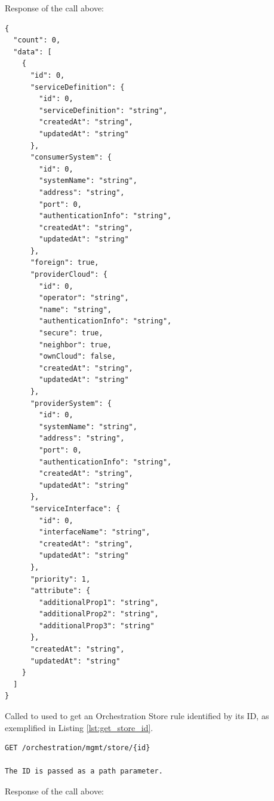 \documentclass[a4paper]{arrowhead}
\newcommand{\fref}[1]{{\textcolor{ArrowheadBlue}{\hyperref[sec:functions:#1]{#1}}}}
\begin{document}
Response of the call above:

\begin{lstlisting}[language=http,label={lst:get_consumer_res},caption={A \fref{Get Entries by Consumers} response is an StoreEntryList}]
{
  "count": 0,
  "data": [
    {
      "id": 0,
      "serviceDefinition": {
        "id": 0,
        "serviceDefinition": "string",
        "createdAt": "string",
        "updatedAt": "string"
      },
      "consumerSystem": {
        "id": 0,
        "systemName": "string",
        "address": "string",
        "port": 0,
        "authenticationInfo": "string",
        "createdAt": "string",
        "updatedAt": "string"
      },
      "foreign": true,
      "providerCloud": {
        "id": 0,
        "operator": "string",
        "name": "string",
        "authenticationInfo": "string",
        "secure": true,
        "neighbor": true,
        "ownCloud": false,
        "createdAt": "string",
        "updatedAt": "string"
      },
      "providerSystem": {
        "id": 0,
        "systemName": "string",
        "address": "string",
        "port": 0,
        "authenticationInfo": "string",
        "createdAt": "string",
        "updatedAt": "string"
      },
      "serviceInterface": {
        "id": 0,
        "interfaceName": "string",
        "createdAt": "string",
        "updatedAt": "string"
      },
      "priority": 1,
      "attribute": {
        "additionalProp1": "string",
        "additionalProp2": "string",
        "additionalProp3": "string"
      },
      "createdAt": "string",
      "updatedAt": "string"
    }
  ]
}
\end{lstlisting}


Called to used to get an Orchestration Store rule identified by its ID, as exemplified in Listing \ref{lst:get_store_id}.

\begin{lstlisting}[language=http,label={lst:get_store_id},caption={A \fref{Get Store Entry by ID} invocation.}]
GET /orchestration/mgmt/store/{id}

The ID is passed as a path parameter.
\end{lstlisting}

Response of the call above:
\end{document}
